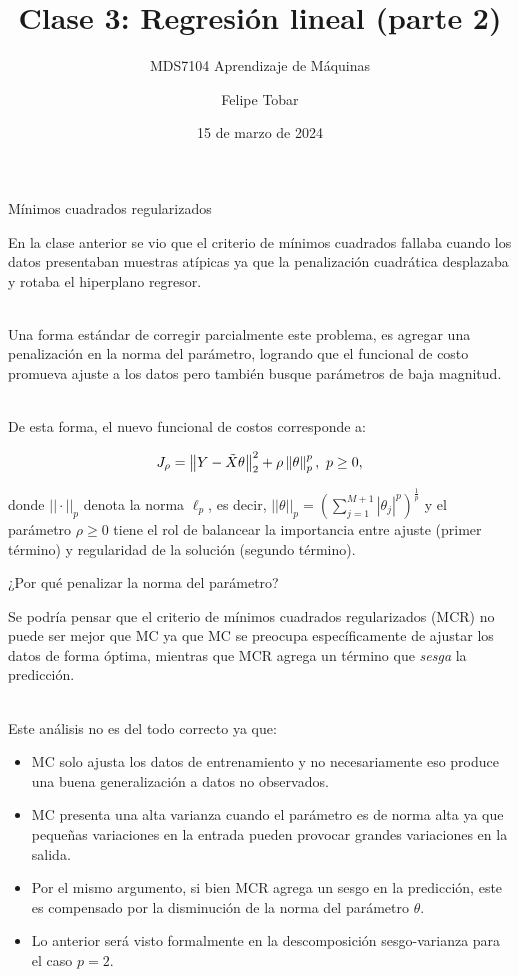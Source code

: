 \documentclass[handout, 9pt]{beamer}
\title{Clase 3: Regresión lineal (parte 2)}
\subtitle{MDS7104 Aprendizaje de Máquinas}
\date{15 de marzo de 2024}
\author{Felipe Tobar}
\institute{Iniciativa de Datos e Inteligencia Artificial\\Universidad de Chile}
\begin{document}
\begin{frame}
  \titlepage
\end{frame}

\begin{frame}{Mínimos cuadrados regularizados}

En la clase anterior se vio que el criterio de mínimos cuadrados fallaba cuando los datos presentaban muestras atípicas ya que la penalización cuadrática desplazaba y rotaba el hiperplano regresor.\\~\ \pause

Una forma estándar de corregir parcialmente este problema, es agregar una penalización en la norma del parámetro, logrando que el funcional de costo promueva ajuste a los datos pero también busque parámetros de baja magnitud.\\~\ \pause

De esta forma, el nuevo funcional de costos corresponde a:

\begin{equation*}
	J_\rho = \left\lVert Y-\tilde{X}\theta\right\rVert_2^2 + \rho\left\lVert\theta\right\rVert_p^p,\ p\geq 0,
\end{equation*}

donde $||\cdot||_p$ denota la norma $\ell_p$, es decir, $||\theta||_p=\left(\sum\limits_{j=1}^{M+1}|\theta_j|^p\right)^\frac{1}{p}$ y el parámetro $\rho\geq0$ tiene el rol de balancear la importancia entre ajuste (primer término) y regularidad de la solución (segundo término).
	 
\end{frame}

\begin{frame}{¿Por qué penalizar la norma del parámetro?}

Se podría pensar que el criterio de mínimos cuadrados regularizados (MCR) no puede ser mejor que MC ya que MC se preocupa específicamente de ajustar los datos de forma óptima, mientras que MCR agrega un término que \emph{sesga} la predicción.\\~\ \pause

Este análisis no es del todo correcto ya que: 

\begin{itemize}
	\item MC solo ajusta los datos de entrenamiento y no necesariamente eso produce una buena generalización a datos no observados.\pause
	\item MC presenta una alta varianza cuando el parámetro es de norma alta ya que pequeñas variaciones en la entrada pueden provocar grandes variaciones en la salida.\pause
	\item Por el mismo argumento, si bien MCR agrega un sesgo en la predicción, este es compensado por la disminución de la norma del parámetro $\theta$.\pause
	\item Lo anterior será visto formalmente en la descomposición sesgo-varianza para el caso $p=2$.
\end{itemize}
	
\end{frame}
\end{document}
